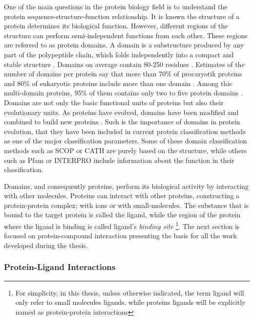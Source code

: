 \documentclass[11pt, b5paper,twoside]{tesi_upf}
\begin{document}
\par One of the main questions in the protein biology field is to understand the protein sequence-structure-function relationship. It is known the structure of a protein determines its biological function. However, different regions of the structure can perform semi-independent functions from each other. These regions are referred to as protein domains. A domain is a substructure produced by any part of the polypeptide chain, which folds independently into a compact and stable structure \cite{Richardson1981, Bork1991, DomainDef}. Domains on average contain 80-250 residues \cite{Islam1995}. Estimates of the number of domains per protein say that more than 70\% of procaryotik proteins and 80\% of eukaryotic proteins include more than one domain \cite{Han2007, Chothia2003}. Among this multi-domain proteins, 95\% of them contains only two to five protein domains \cite{Han2007}.  Domains are not only the basic functional units of proteins but also their evolutionary units. As proteins have evolved, domains have been modified and combined to build new proteins \cite{Vogel2004, Apic2001}. 
Such is the importance  of domains in protein evolution, that they have been included in current protein classification methods as one of the major classification parameters. Some of these domain classification methods such as SCOP \cite{Murzin1995} or CATH \cite{Orengo1997} are purely based on the structure, while others such as Pfam \cite{Bateman2002} or INTERPRO \cite{Hunter2009} include information about the function in their classification. 
\par Domains, and consequently proteins, perform its biological activity by interacting with other molecules. Proteins can interact with other proteins, constructing a protein-protein complex; with ions or with small-molecules. The substance that is bound to the target protein is called the ligand, while the region of the protein where the ligand is binding is called ligand's \textit{binding site} \footnote{For simplicity, in this thesis, unless otherwise indicated, the term ligand will only refer to small molecules ligands, while proteins ligands will be explicitly named as protein-protein interactions}. The next section is focused on protein-compound interaction presenting the basis for all the work developed during the thesis. 



\subsubsection{Protein-Ligand Interactions} \label{ligand_intect}
\end{document}
